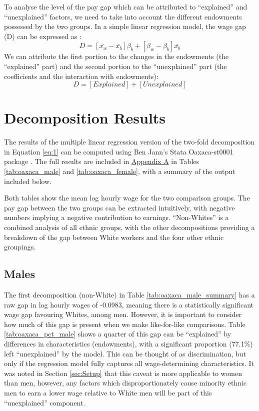\documentclass[class=article, crop=false]{standalone}
\begin{document}
To analyse the level of the pay gap which can be attributed to \enquote{explained} and \enquote{unexplained} factors, we need to take into account the different endowments possessed by the two groups. In a simple linear regression model, the wage gap (D) can be expressed as \citep{WB}:
\begin{equation}
  D = [\bar{x_{w}} - \bar{x_{b}}]\beta_{b} + [\beta_{w} - \beta_{b}]\bar{x_{b}}
  \label{eq:1}
\end{equation}
We can attribute the first portion to the changes in the endowments (the \enquote{explained} part) and the second portion to the \enquote{unexplained} part (the coefficients and the interaction with endowments):
\begin{equation}
  D = [Explained] + [Unexplained]
  \label{eq:2}
\end{equation}

\section{Decomposition Results}
\label{sec:Decomposition Results}
The results of the multiple linear regression version of the two-fold decomposition in Equation \ref{eq:1} can be computed using Ben Jann's Stata Oaxaca-st0001 package \citep{Jann}. The full results are included in \hyperref[sec:appendixA]{Appendix A} in Tables \ref{tab:oaxaca_male} and \ref{tab:oaxaca_female}, with a summary of the output included below.

Both tables show the mean log hourly wage for the two comparison groups. The pay gap between the two groups can be extracted intuitively, with negative numbers implying a negative contribution to earnings. \enquote{Non-Whites} is a combined analysis of all ethnic groups, with the other decompositions providing a breakdown of the gap between White workers and the four other ethnic groupings.

\subsection{Males}
\label{sec:Males} %
The first decomposition (non-White) in Table \ref{tab:oaxaca_male_summary} has a raw gap in log hourly wages of -0.0983, meaning there is a statistically significant wage gap favouring Whites, among men. However, it is important to consider how much of this gap is present when we make like-for-like comparisons. Table \ref{tab:oaxaca_pct_male} shows a quarter of this gap can be \enquote{explained} by differences in characteristics (endowments), with a significant proportion (77.1\%) left \enquote{unexplained} by the model. This can be thought of as discrimination, but only if the regression model fully captures all wage-determining characteristics. It was noted in Section \ref{sec:Setup} that this caveat is more applicable to women than men, however, any factors which disproportionately cause minority ethnic men to earn a lower wage relative to White men will be part of this \enquote{unexplained} component.
\end{document}
